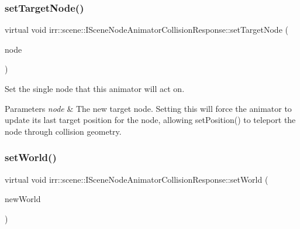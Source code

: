 \subsubsection{\texorpdfstring{set\+Target\+Node()}{setTargetNode()}\hspace{0.1cm}{\footnotesize\ttfamily [2/2]}}
{\footnotesize\ttfamily virtual void irr\+::scene\+::\+I\+Scene\+Node\+Animator\+Collision\+Response\+::set\+Target\+Node (\begin{DoxyParamCaption}\item[{\hyperlink{classirr_1_1scene_1_1ISceneNode}{I\+Scene\+Node} $\ast$}]{node }\end{DoxyParamCaption})\hspace{0.3cm}{\ttfamily [pure virtual]}}



Set the single node that this animator will act on. 


\begin{DoxyParams}{Parameters}
{\em node} & The new target node. Setting this will force the animator to update its last target position for the node, allowing set\+Position() to teleport the node through collision geometry. \\
\hline
\end{DoxyParams}
\mbox{\label{classirr_1_1scene_1_1ISceneNodeAnimatorCollisionResponse_a42aa84d4843a734f8dd1f20b5c92ef06}} 
\subsubsection{\texorpdfstring{set\+World()}{setWorld()}\hspace{0.1cm}{\footnotesize\ttfamily [1/2]}}
{\footnotesize\ttfamily virtual void irr\+::scene\+::\+I\+Scene\+Node\+Animator\+Collision\+Response\+::set\+World (\begin{DoxyParamCaption}\item[{\hyperlink{classirr_1_1scene_1_1ITriangleSelector}{I\+Triangle\+Selector} $\ast$}]{new\+World }\end{DoxyParamCaption})\hspace{0.3cm}{\ttfamily [pure virtual]}}



